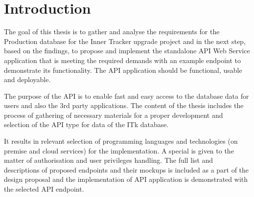 \chapter{Introduction}
\label{chap:introduction}
\par The goal of this thesis is to gather and analyse the requirements for the Production database for the Inner Tracker upgrade project and in the next step, based on the findings, to propose and implement the standalone API Web Service application that is meeting the required demands with an example endpoint to demonstrate its functionality. The API application should be functional, usable and deployable.

\par The purpose of the API is to enable fast and easy access to the database data for users and also the 3rd party applications. The content of the thesis includes the process of gathering of necessary materials for a proper development and selection of the API type for data of the ITk database.

\par It results in relevant selection of programming languages and technologies (on premise and cloud services) for the implementation. A special is given to the matter of authorisation and user privileges handling. The full list and descriptions of proposed endpoints and their mockups is included as a part of the design proposal and the implementation of API application is demonstrated with the selected API endpoint.